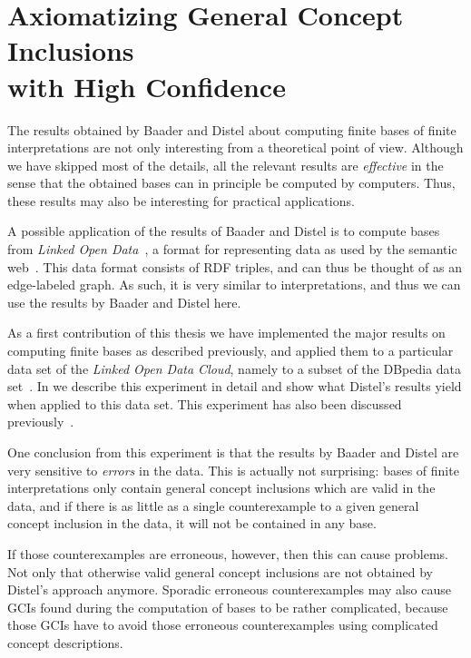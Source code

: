 \chapter[Axiomatizing General Concept Inclusions with High Confidence]{Axiomatizing
  General Concept Inclusions\\ with High Confidence}
\label{cha:axiom-conf-el}

The results obtained by Baader and Distel about computing finite bases of finite
interpretations are not only interesting from a theoretical point of view.  Although we
have skipped most of the details, all the relevant results are \emph{effective} in the
sense that the obtained bases can in principle be computed by computers.  Thus, these
results may also be interesting for practical applications.

A possible application of the results of Baader and Distel is to compute bases from
\emph{Linked Open Data}~\cite{Linked-Data}, a format for representing data as used by the
semantic web~\cite{journal/sciam/BernersLeeHL01,DBLP:conf/dagstuhl/2003sweb,FOST}.  This
data format consists of RDF triples, and can thus be thought of as an edge-labeled graph.
As such, it is very similar to interpretations, and thus we can use the results by Baader
and Distel here.

As a first contribution of this thesis we have implemented the major results on computing
finite bases as described previously, and applied them to a particular data set of the
\emph{Linked Open Data Cloud}, namely to a subset of the DBpedia data set~\cite{DBpedia}.
In  we describe this experiment in detail and show what
Distel's results yield when applied to this data set.  This experiment has also been
discussed previously~\cite{Borchmann:confident-GCIs,DBLP:conf/icdm/BorchmannD11}.

One conclusion from this experiment is that the results by Baader and Distel are very
sensitive to \emph{errors} in the data.  This is actually not surprising: bases of finite
interpretations only contain general concept inclusions which are valid in the data, and
if there is as little as a single counterexample to a given general concept inclusion in
the data, it will not be contained in any base.

If those counterexamples are erroneous, however, then this can cause problems.  Not only
that otherwise valid general concept inclusions are not obtained by Distel's approach
anymore.  Sporadic erroneous counterexamples may also cause GCIs found during the
computation of bases to be rather complicated, because those GCIs have to avoid those
erroneous counterexamples using complicated concept descriptions.

